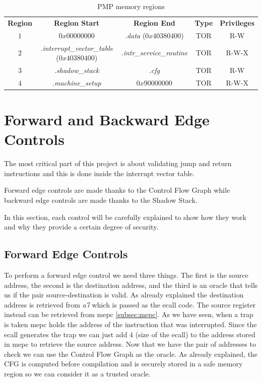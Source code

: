 \begin{table}
  \centering
  \begin{tabular}{|c|c|c|c|c|}
    \hline
    \textbf{Region}    & \textbf{Region Start}                             & \textbf{Region End}              & \textbf{Type} & \textbf{Privileges} \\
    \hhline{=====} $1$ & $0x00000000$                                      & \textit{.data} ($0x40380400$)    & TOR           & R-W                 \\
    \hline
    $2$                & \textit{.interrupt\_vector\_table} ($0x40380400$) & \textit{.intr\_service\_routine} & TOR           & R-W-X               \\
    \hline
    $3$                & \textit{.shadow\_stack}                           & \textit{.cfg}                    & TOR           & R-W                 \\
    \hline
    $4$                & \textit{.machine\_setup}                          & $0x90000000$                     & TOR           & R-W-X               \\
    \hline
  \end{tabular}
  \caption{PMP memory regions}
  \label{tab:pmpregions}
\end{table}

\section{Forward and Backward Edge Controls}
\label{sec:project_controls}

The most critical part of this project is about validating jump and return instructions
and this is done inside the interrupt vector table.

Forward edge controls are made thanks to the Control Flow Graph while backward edge
controls are made thanks to the Shadow Stack.

In this section, each control will be carefully explained to show how they work
and why they provide a certain degree of security.

\subsection{Forward Edge Controls}
\label{subsec:forward}

To perform a forward edge control we need three things. The first is the source
address, the second is the destination address, and the third is an oracle that
tells us if the pair source-destination is valid. As already explained the destination
address is retrieved from \textit{a7} which is passed as the ecall code. The source
register instead can be retrieved from mepc \ref{subsec:mepc}. As we have seen, when
a trap is taken mepc holds the address of the instruction that was interrupted.
Since the ecall generates the trap we can just add $4$ (size of the ecall) to
the address stored in mepc to retrieve the source address. Now that we have the pair
of addresses to check we can use the Control Flow Graph as the oracle. As
already explained, the CFG is computed before compilation and is securely stored
in a safe memory region so we can consider it as a trusted oracle.

